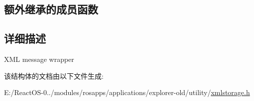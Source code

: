 \subsection*{额外继承的成员函数}


\subsection{详细描述}
X\+ML message wrapper 

该结构体的文档由以下文件生成\+:\begin{DoxyCompactItemize}
\item 
E\+:/\+React\+O\+S-\/0../modules/rosapps/applications/explorer-\/old/utility/\hyperlink{xmlstorage_8h}{xmlstorage.\+h}\end{DoxyCompactItemize}
